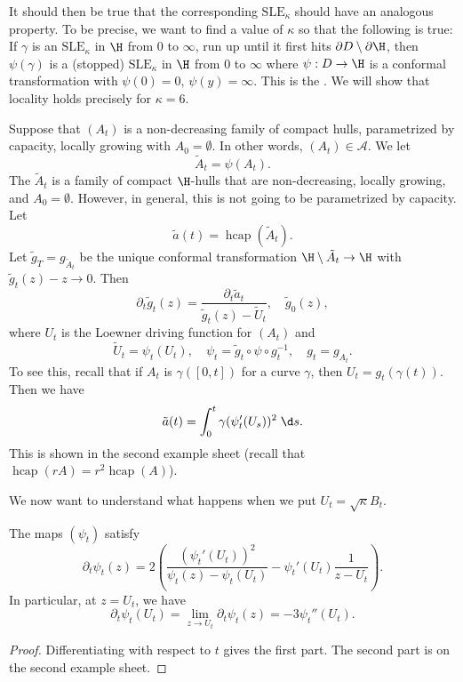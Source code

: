 \documentclass[a4paper]{article}
\DeclareMathOperator\hcap{hcap}
\newcommand\SLE{\mathrm{SLE}}
\begin{document}
It should then be true that the corresponding $\SLE_\kappa$ should have an analogous property. To be precise, we want to find a value of $\kappa$ so that the following is true: If $\gamma$ is an $\SLE_\kappa$ in $\H$ from $0$ to $\infty$, run up until it first hits $\partial D \setminus \partial \H$, then $\psi(\gamma)$ is a (stopped) $\SLE_\kappa$ in $\H$ from $0$ to $\infty$ where $\psi: D \to \H$ is a conformal transformation with $\psi(0) = 0$, $\psi(y) = \infty$. This is the . We will show that locality holds precisely for $\kappa = 6$.

Suppose that $(A_t)$ is a non-decreasing family of compact hulls, parametrized by capacity, locally growing with $A_0 = \emptyset$. In other words, $(A_t) \in \mathcal{A}$. We let
\[
  \tilde{A}_t = \psi(A_t).
\]
The $\tilde{A}_t$ is a family of compact $\H$-hulls that are non-decreasing, locally growing, and $A_0 = \emptyset$. However, in general, this is not going to be parametrized by capacity. Let
\[
  \tilde{a}(t) = \hcap(\tilde{A}_t).
\]
Let $\tilde{g}_T = g_{\tilde{A}_t}$ be the unique conformal transformation $\H \setminus \tilde{A}_t \to \H$ with $\tilde{g}_t(z) - z \to 0$. Then
\[
  \partial_t \tilde{g}_t (z) = \frac{\partial_t \tilde{a}_t}{\tilde{g}_t(z) - \tilde{U}_t},\quad \tilde{g}_0(z),
\]
where $U_t$ is the Loewner driving function for $(A_t)$ and
\[
  \tilde{U}_t = \psi_t(U_t),\quad \psi_t = \tilde{g}_t \circ \psi \circ g_t^{-1},\quad g_t = g_{A_t}.
\]
To see this, recall that if $A_t$ is $\gamma([0, t])$ for a curve $\gamma$, then $U_t = g_t(\gamma(t))$. Then we have
\[
  \tilde{a}(t) = \int_0^t \gamma(\psi_t'(U_s))^2\;\d s.
\]
This is shown in the second example sheet (recall that $\hcap(rA) = r^2 \hcap(A)$).

We now want to understand what happens when we put $U_t = \sqrt{\kappa} B_t$.
\begin{prop}
  The maps $(\psi_t)$ satisfy
  \[
    \partial_t \psi_t(z) = 2 \left(\frac{(\psi_t'(U_t))^2}{\psi_t(z) - \psi_t(U_t)} - \psi_t' (U_t) \frac{1}{z - U_t}\right).
  \]
  In particular, at $z = U_t$, we have
  \[
    \partial_t \psi_t(U_t) = \lim_{z \to U_t} \partial_t \psi_t (z) = -3 \psi_t''(U_t).
  \]
\end{prop}

\begin{proof}
  Differentiating with respect to $t$ gives the first part. The second part is on the second example sheet.
\end{proof}
\end{document}
